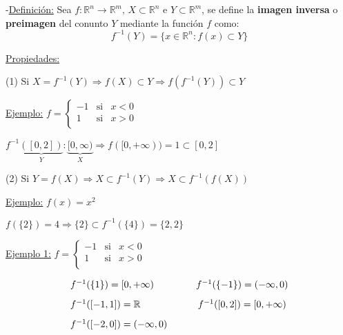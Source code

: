 \documentclass[10pt, titlepage]{article}
\newcommand{\R}{\mathbb{R}}
\newcommand{\definicion}{\noindent-\underline{Definición:} }
\newcommand{\dindent}{\indent\indent}
\newcommand{\tindent}{\indent\indent\indent}
\begin{document}
\definicion Sea $f : \R^n \to \R^m, \, X \subset \R^n \text{ e } Y \subset \R^m$, se define la 
\textbf{imagen inversa} o \textbf{preimagen} del conunto $Y$ mediante la función $f$ como:
\[
\boxed{
f^{-1} (Y) = \{x \in \R^n : f (x) \subset Y\}
}
\]
\vspace{3mm}

\underline{Propiedades:}
\vspace{3mm}

\dindent (1) Si $X = f^{-1} (Y) \Rightarrow f (X) \subset Y \Rightarrow f (f^{-1} (Y)) \subset Y$
\vspace{3mm}

\tindent \underline{Ejemplo:} $f = 
\left \{ \begin{array}{ccc}

-1 & \text{si} & x < 0\\
1 & \text{si} & x>0\\

\end{array}\right.$
\vspace{2mm}

\tindent \indent $f^{-1} \underbrace{([0, 2])}_{Y} : \underbrace{[0, \infty)}_{X} \Rightarrow f ([0, +\infty)) 
= {1} \subset [0, 2]$
\vspace{3mm}

\dindent (2) Si $Y = f (X) \Rightarrow X \subset f^{-1} (Y) \Rightarrow X \subset f^{-1} (f (X))$
\vspace{3mm}

\tindent \underline{Ejemplo:} $f (x) = x^2$
\vspace{3mm}

\tindent \indent $f (\{2\}) = 4 \Rightarrow \{2\} \subset f^{-1} (\{4\}) = \{2, 2\}$
\vspace{5mm}

\underline{Ejemplo 1:} $
f = 
\left \{ \begin{array}{ccc}

-1 & \text{si} & x < 0\\
1 & \text{si} & x>0\\

\end{array}\right.
$
\vspace{3mm}

\[
\begin{array}{lccrc}

f^{-1} (\{1\}) = [0, +\infty) & \quad & f^{-1} (\{-1\}) = (- \infty, 0) \vspace{3mm}\\
f^{-1} ([-1, 1]) = \R & \quad & f^{-1} ([0, 2]) = [0, +\infty)\vspace{3mm}\\
f^{-1} ([-2, 0]) = (-\infty, 0) & \quad &\\

\end{array}
\]
\vspace{3mm}
\end{document}
